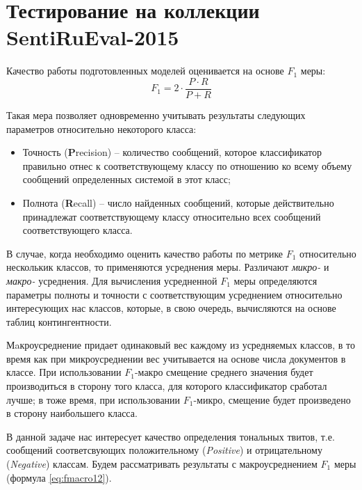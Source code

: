 \section{Тестирование на коллекции SentiRuEval-2015}
\label{sec:sentirueval2015}

Качество работы подготовленных моделей оценивается на основе $F_1$ меры:
\begin{equation}
    \label{eq:fmeasure}
    F_1 = 2 \cdot \dfrac{P \cdot R}{P + R}
\end{equation}

Такая мера позволяет одновременно учитывать результаты следующих параметров
относительно некоторого класса:
\begin{itemize}
    \item Точность ({\bf P}recision) -- количество сообщений, которое
        классификатор правильно отнес к соответствующему классу по отношению ко
        всему объему сообщений определенных системой в этот класс;
    \item Полнота ({\bf R}ecall) -- число найденных сообщений, которые
        действительно принадлежат соответствующему классу относительно всех
        сообщений соответствующего класса.
\end{itemize}

В случае, когда необходимо оценить качество работы по метрике $F_1$ относительно
несколькик классов, то применяются усреднения меры.
Различают {\it микро-} и {\it макро-} усреднения.
Для вычисления усредненной $F_{1}$ меры определяются
параметры полноты и точности с соответствующим усреднением относительно
интересующих нас классов, которые, в свою очередь, вычисляются на основе
таблиц контингентности.

%
%

Мaкроусреднение придает одинаковый вес каждому из усредняемых классов, в то
время как при микроусреднении вес учитывается на основе числа документов в
классе.
При использовании $F_{1}$-макро смещение среднего значения будет производиться в
сторону того класса, для которого классификатор сработал лучше; в тоже время,
при использовании $F_{1}$-микро, смещение будет произведено в сторону наибольшего
класса. \cite{micromacromeasures}

В данной задаче нас интересует качество определения тональных твитов, т.е.
сообщений соответсвующих положительному ({\it Positive}) и отрицательному
({\it Negative}) классам.
Будем рассматривать результаты с макроусреднением $F_1$ меры
(формула \ref{eq:fmacro12}).

